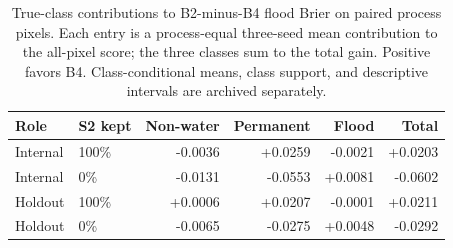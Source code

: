 \begin{table}[H]
\caption{True-class contributions to B2-minus-B4 flood Brier on paired process pixels. Each entry is a process-equal three-seed mean contribution to the all-pixel score; the three classes sum to the total gain. Positive favors B4. Class-conditional means, class support, and descriptive intervals are archived separately.}
\label{tab:opticalclass}
\centering\small
\setlength{\tabcolsep}{5pt}
\renewcommand{\arraystretch}{1.15}
\begin{tabular}{@{}llrrrr@{}}
\hline
Role & S2 kept & Non-water & Permanent & Flood & Total \\
\hline
Internal & 100\% & -0.0036 & +0.0259 & -0.0021 & +0.0203 \\
Internal & 0\% & -0.0131 & -0.0553 & +0.0081 & -0.0602 \\
\hline
Holdout & 100\% & +0.0006 & +0.0207 & -0.0001 & +0.0211 \\
Holdout & 0\% & -0.0065 & -0.0275 & +0.0048 & -0.0292 \\
\hline
\end{tabular}
\end{table}
